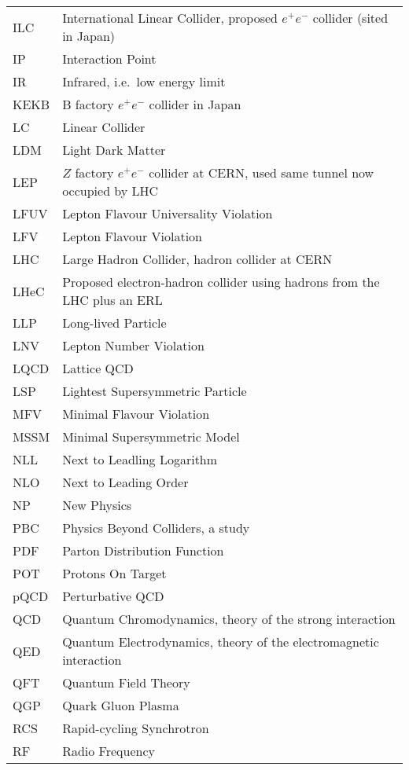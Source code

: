 \begin{tabular}{ll}
ILC     &   International Linear Collider, proposed $e^+e^-$ collider (sited in Japan) \\
IP      &   Interaction Point \\
IR      &   Infrared, i.e.\ low energy limit \\
KEKB    &   B factory $e^+e^-$ collider in Japan \\
LC      &   Linear Collider \\
LDM     &   Light Dark Matter \\
LEP     &   $Z$ factory $e^+e^-$ collider at CERN, used same tunnel now occupied by LHC\\
LFUV	&	Lepton Flavour Universality Violation \\
LFV		& 	Lepton Flavour Violation \\
LHC     &   Large Hadron Collider, hadron collider at CERN \\
LHeC    &   Proposed electron-hadron collider using hadrons from the LHC plus an ERL \\
LLP     &   Long-lived Particle \\
LNV		& 	Lepton Number Violation \\
LQCD    &   Lattice QCD \\
LSP     &   Lightest Supersymmetric Particle \\
MFV	    &	Minimal Flavour Violation \\
MSSM    &   Minimal Supersymmetric Model \\
NLL     &   Next to Leadling Logarithm \\
NLO     &   Next to Leading Order \\
NP		&	New Physics \\
PBC     &   Physics Beyond Colliders, a study \\
PDF     &   Parton Distribution Function \\
POT     &   Protons On Target \\
pQCD    &   Perturbative QCD \\
QCD	    & 	Quantum Chromodynamics, theory of the strong interaction \\
QED     &   Quantum Electrodynamics, theory of the electromagnetic interaction \\
QFT     &   Quantum Field Theory \\
QGP     &   Quark Gluon Plasma \\
RCS     &   Rapid-cycling Synchrotron \\
RF      &   Radio Frequency \\

\end{tabular}
